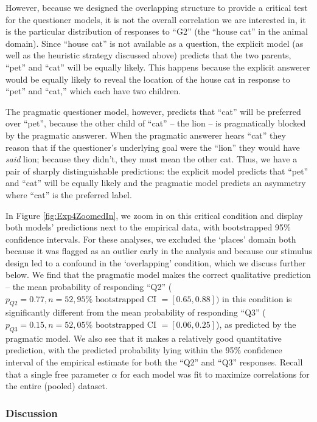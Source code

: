 \documentclass[12pt, floatsintext, jou]{apa6}
\begin{document}
However, because we designed the overlapping structure to provide a critical test for the questioner models, it is not the overall correlation we are interested in, it is the particular distribution of responses to ``G2'' (the ``house cat'' in the animal domain). Since ``house cat'' is not available as a question, the explicit model (as well as the heuristic strategy discussed above) predicts that the two parents, ``pet'' and ``cat'' will be equally likely. This happens because the explicit answerer would be equally likely to reveal the location of the house cat in response to ``pet'' and ``cat,'' which each have two children. 

The pragmatic questioner model, however, predicts that ``cat'' will be preferred over ``pet'', because the other child of ``cat'' -- the lion -- is pragmatically blocked by the pragmatic answerer. When the pragmatic answerer hears ``cat'' they reason that if the questioner's underlying goal were the ``lion'' they would have \emph{said} lion; because they didn't, they must mean the other cat. Thus, we have a pair of sharply distinguishable predictions: the explicit model predicts that ``pet'' and ``cat'' will be equally likely and the pragmatic model predicts an asymmetry where ``cat'' is the preferred label. 

In Figure \ref{fig:Exp4ZoomedIn}, we zoom in on this critical condition and display both models' predictions next to the empirical data, with bootstrapped 95\% confidence intervals. For these analyses, we excluded the `places' domain both because it was flagged as an outlier early in the analysis and because our stimulus design led to a confound in the `overlapping' condition, which we discuss further below. We find that the pragmatic model makes the correct qualitative prediction -- the mean probability of responding ``Q2'' ($p_{Q2} = 0.77, n = 52, 95\%\textrm{ bootstrapped CI }= [0.65, 0.88])$ in this condition is significantly different from the mean probability of responding ``Q3'' ($p_{Q3} = 0.15, n = 52, 05\% \textrm{ bootstrapped CI }=[0.06, 0.25]$), as predicted by the pragmatic model. We also see that it makes a relatively good quantitative prediction, with the predicted probability lying within the 95\% confidence interval of the empirical estimate for both the ``Q2'' and ``Q3'' responses. Recall that a single free parameter $\alpha$ for each model was fit to maximize correlations for the entire (pooled) dataset.




\subsubsection{Discussion}
\end{document}
